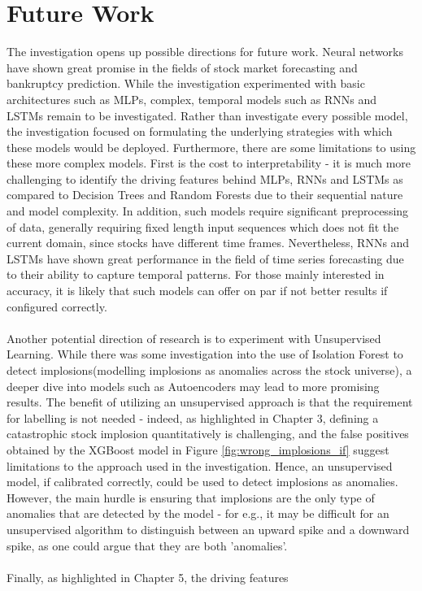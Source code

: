 \documentclass[a4paper]{report}
\begin{document}
\section{Future Work}
The investigation opens up possible directions for future work. Neural networks have shown great promise in the fields of stock market forecasting and bankruptcy prediction. While 
the investigation experimented with basic architectures such as MLPs, complex, temporal models such as RNNs and LSTMs remain to be investigated. Rather than investigate every possible model,
the investigation focused on formulating the underlying strategies with which these models would be deployed. Furthermore, there are some limitations to using these more complex models. First 
is the cost to interpretability - it is much more challenging to identify the driving features behind MLPs, RNNs and LSTMs as compared to Decision Trees and Random Forests due to their 
sequential nature and model complexity. In addition, such models require significant preprocessing of data, generally requiring fixed length input sequences which does not fit 
the current domain, since stocks have different time frames. Nevertheless, RNNs and LSTMs have shown great performance in the field of 
time series forecasting due to their ability to capture temporal patterns. For those mainly interested in accuracy, it is likely that such models can offer on par if not better 
results if configured correctly.\\\\Another potential direction of research is to experiment with Unsupervised Learning. While there was some investigation into the use of Isolation Forest 
to detect implosions(modelling implosions as anomalies across the stock universe), a deeper dive into models such as Autoencoders may lead to more promising results. The benefit 
of utilizing an unsupervised approach is that the requirement for labelling is not needed - indeed, as highlighted in Chapter 3, defining a catastrophic stock implosion quantitatively 
is challenging, and the false positives obtained by the XGBoost model in Figure \ref{fig:wrong_implosions_if} suggest limitations to the approach used in the investigation. Hence, an unsupervised model, if calibrated correctly, could be used to detect implosions as anomalies.
However, the main hurdle is ensuring that implosions are the only type of anomalies that are detected by the model - for e.g., it may be difficult for an unsupervised algorithm 
to distinguish between an upward spike and a downward spike, as one could argue that they are both 'anomalies'.\\\\Finally, as highlighted in Chapter 5, the driving features 
\end{document}
